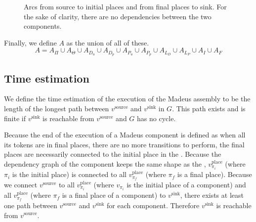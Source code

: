 \begin{figure}[h]
{\begin{minipage}[c]{1.3\columnwidth}
    \end{minipage}
  }
  \caption{Arcs from source to initial places and from final places to sink. For the sake of clarity, there are no dependencies between the two components.}
  \label{fig:source_sink_graph}
\end{figure}

Finally, we define $A$ as the union of all of these. 
\[
A=A_\Pi\cup A_{\Theta}\cup A_{D_{u}}\cup A_{D_{p}}\cup A_{P_{u}}\cup A_{P_{p}}\cup A_{L_{D}}\cup A_{L_{P}}\cup A_{I}\cup A_{F}
\]


\subsection{Time estimation}

We define the time estimation of the execution of the Madeus assembly
to be the length of the longest path between $v^\text{source}$ and
$v^\text{sink}$ in $G$. This path exists and is finite if $v^\text{sink}$ 
is reachable from $v^\text{source}$ and $G$ has no cycle.

Because the end of the execution of a Madeus component is defined as
when all its tokens are in final places, \ie there are no more transitions
to perform, the final places are necessarily connected to the initial place
in the \net. Because the dependency graph of the component keeps the same
shape as the \net, $v_{\pi_i}^\text{place}$ (where $\pi_i$ is the initial
place) is connected to all $v_{\pi_f}^\text{place}$ (where $\pi_f$ is a
final place). Because we connect $v^\text{source}$ to all
$v_{\pi_i}^\text{place}$ (where $v_{\pi_i}$ is the initial place of a
component) and all $v_{\pi_f}^\text{place}$ (where $\pi_f$ is a final place
of a component) to $v^\text{sink}$, there exists at least one path between
$v^\text{source}$ and $v^\text{sink}$ for each component. Therefore
$v^\text{sink}$ is reachable from $v^\text{source}$.

